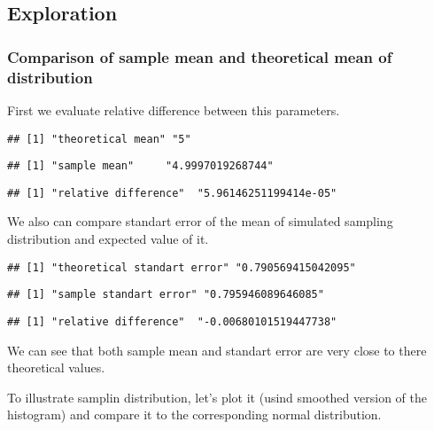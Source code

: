 \documentclass[]{article}
\begin{document}
\subsection{Exploration}\label{exploration}

\subsubsection{Comparison of sample mean and theoretical mean of
distribution}\label{comparison-of-sample-mean-and-theoretical-mean-of-distribution}

First we evaluate relative difference between this parameters.

\begin{verbatim}
## [1] "theoretical mean" "5"
\end{verbatim}

\begin{verbatim}
## [1] "sample mean"     "4.9997019268744"
\end{verbatim}

\begin{verbatim}
## [1] "relative difference"  "5.96146251199414e-05"
\end{verbatim}

We also can compare standart error of the mean of simulated sampling
distribution and expected value of it.

\begin{verbatim}
## [1] "theoretical standart error" "0.790569415042095"
\end{verbatim}

\begin{verbatim}
## [1] "sample standart error" "0.795946089646085"
\end{verbatim}

\begin{verbatim}
## [1] "relative difference"  "-0.00680101519447738"
\end{verbatim}

We can see that both sample mean and standart error are very close to
there theoretical values.

To illustrate samplin distribution, let's plot it (usind smoothed
version of the histogram) and compare it to the corresponding normal
distribution.
\end{document}
